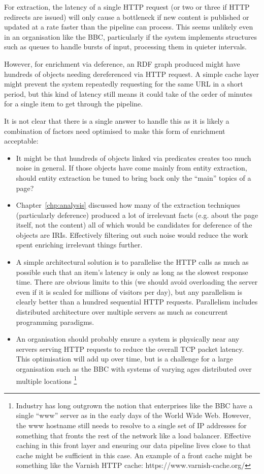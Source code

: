 For extraction, the latency of a single HTTP request (or two or three
if HTTP redirects are issued) will only cause a bottleneck if new
content is published or updated at a rate faster than the pipeline
can process. This seems unlikely even in an organisation like the BBC,
particularly if the system implements structures such as queues to
handle bursts of input, processing them in quieter intervals.

However, for enrichment via deference, an RDF graph produced might
have hundreds of objects needing dereferenced via HTTP request. A
simple cache layer might prevent the system repeatedly requesting for
the same URL in a short period, but this kind of latency still means
it could take of the order of minutes for a single item to get
through the pipeline.

It is not clear that there is a single answer to handle this as it is
likely a combination of factors need optimised to make this form
of enrichment acceptable:

\begin{itemize}
\item It might be that hundreds of objects linked via predicates
  creates too much noise in general. If those objects have come mainly
  from entity extraction, should entity extraction be tuned to bring
  back only the ``main'' topics of a page?
\item Chapter~\ref{chp:analysis} discussed how many of the extraction
  techniques (particularly deference) produced a lot of irrelevant
  facts (e.g. about the page itself, not the content) all of which
  would be candidates for deference of the objects are IRIs.
  Effectively filtering out such noise would reduce the work spent
  enriching irrelevant things further.
\item A simple architectural solution is to parallelise the HTTP
  calls as much as possible such that an item's latency is only as
  long as the slowest response time. There are obvious limits to this
  (we should avoid overloading the server even if it is scaled for
  millions of visitors per day), but any parallelism is clearly
  better than a hundred sequential HTTP requests. Parallelism includes
  distributed architecture over multiple servers as much as
  concurrent programming paradigms.
\item An organisation should probably ensure a system is physically
  near any servers serving HTTP requests to reduce the overall TCP
  packet latency. This optimisation will add up over time, but is
  a challenge for a large organisation such as the BBC with systems
  of varying ages distributed over multiple locations
  \footnote{Industry has
  long outgrown the notion
  that enterprises like the BBC have a single ``www'' server as
  in the early days of the World Wide Web. However, the www hostname
  still needs to resolve to a single set of IP addresses for something
  that fronts the rest of the network like a load balancer. Effective
  caching in this front layer and ensuring our data pipeline lives close
  to that cache might be sufficient in this case. An example of a
  front cache might be something like the Varnish HTTP cache:
  https://www.varnish-cache.org/}
\end{itemize}

